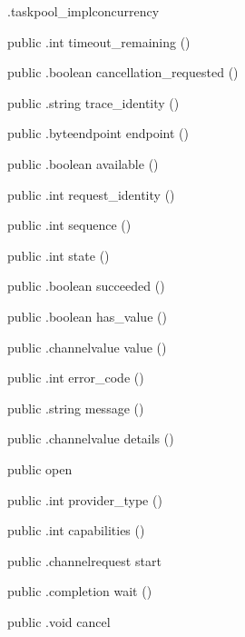 \begin{CrexxClass}{.taskpool\_impl}{concurrency}
\begin{Members}
    \Method
      {public}
      {.int}
      {timeout\_remaining}
      {()}

    \Method
      {public}
      {.boolean}
      {cancellation\_requested}
      {()}

    \Method
      {public}
      {.string}
      {trace\_identity}
      {()}

    \Method
      {public}
      {.byteendpoint}
      {endpoint}
      {()}

    \Method
      {public}
      {.boolean}
      {available}
      {()}

    \Method
      {public}
      {.int}
      {request\_identity}
      {()}

    \Method
      {public}
      {.int}
      {sequence}
      {()}

    \Method
      {public}
      {.int}
      {state}
      {()}

    \Method
      {public}
      {.boolean}
      {succeeded}
      {()}

    \Method
      {public}
      {.boolean}
      {has\_value}
      {()}

    \Method
      {public}
      {.channelvalue}
      {value}
      {()}

    \Method
      {public}
      {.int}
      {error\_code}
      {()}

    \Method
      {public}
      {.string}
      {message}
      {()}

    \Method
      {public}
      {.channelvalue}
      {details}
      {()}

    \Factory
      {public}
      {open}
      {}

    \Method
      {public}
      {.int}
      {provider\_type}
      {()}

    \Method
      {public}
      {.int}
      {capabilities}
      {()}

    \Method
      {public}
      {.channelrequest}
      {start}
      {}

    \Method
      {public}
      {.completion}
      {wait}
      {()}

    \Method
      {public}
      {.void}
      {cancel}
      {}


\end{Members}
\end{CrexxClass}
